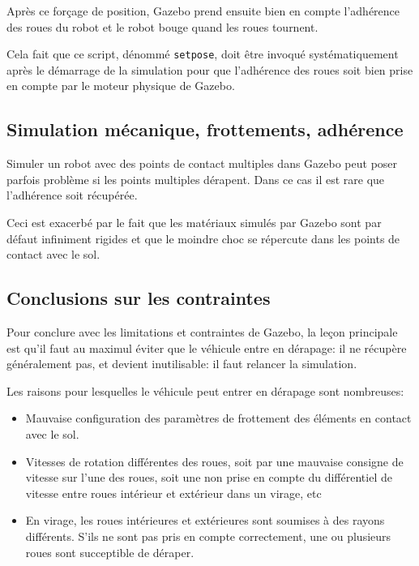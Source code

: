 \documentclass[12pt,a4paper]{report}
\begin{document}
		\para Après ce forçage de position, Gazebo prend ensuite bien en compte l'adhérence des roues du robot et le robot bouge quand les roues tournent. 
		
		\para Cela fait que ce script, dénommé \verb|setpose|, doit être invoqué systématiquement après le démarrage de la simulation pour que l'adhérence des roues soit bien prise en compte par le moteur physique de Gazebo.
		
		\subsection{Simulation mécanique, frottements, adhérence}
		
		Simuler un robot avec des points de contact multiples dans Gazebo peut poser parfois problème si les points multiples dérapent. Dans ce cas il est rare que l'adhérence soit récupérée.
		
		\para Ceci est exacerbé par le fait que les matériaux simulés par Gazebo sont par défaut infiniment rigides et que le moindre choc se répercute dans les points de contact avec le sol. 

		
		\subsection{Conclusions sur les contraintes}
		\label{conc-contrainte-gazebo}
		Pour conclure avec les limitations et contraintes de Gazebo, la leçon principale est qu'il faut au maximul éviter que le véhicule entre en dérapage: il ne récupère généralement pas, et devient inutilisable: il faut relancer la simulation.
		
		\para Les raisons pour lesquelles le véhicule peut entrer en dérapage sont nombreuses:
		\begin{itemize}
			\item Mauvaise configuration des paramètres de frottement des éléments en contact avec le sol.
			\item  Vitesses de rotation différentes des roues, soit par une mauvaise consigne de vitesse sur l'une des roues, soit une non prise en compte du différentiel de vitesse entre roues intérieur et extérieur dans un virage, etc
			
			\item En virage, les roues intérieures et extérieures sont soumises à des rayons différents. S'ils ne sont pas pris en compte correctement, une ou plusieurs roues sont succeptible de déraper.
		\end{itemize}
\end{document}
